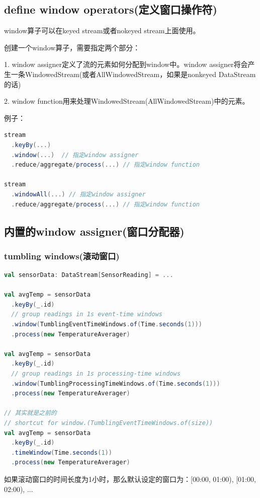 \documentclass[oneside]{ctexbook}
\begin{document}
\subsection{define window operators(定义窗口操作符)}

window算子可以在keyed stream或者nokeyed stream上面使用。

创建一个window算子，需要指定两个部分：

1. window assigner定义了流的元素如何分配到window中。window assigner将会产生一条WindowedStream(或者AllWindowedStream，如果是nonkeyed DataStream的话)

2. window function用来处理WindowedStream(AllWindowedStream)中的元素。

例子：

\begin{lstlisting}[language=scala]
stream
  .keyBy(...)
  .window(...)  // 指定window assigner
  .reduce/aggregate/process(...) // 指定window function

stream
  .windowAll(...) // 指定window assigner
  .reduce/aggregate/process(...) // 指定window function
\end{lstlisting}

\subsection{内置的window assigner(窗口分配器)}

\subsubsection{tumbling windows(滚动窗口)}

\begin{lstlisting}[language=scala]
val sensorData: DataStream[SensorReading] = ...

val avgTemp = sensorData
  .keyBy(_.id)
  // group readings in 1s event-time windows
  .window(TumblingEventTimeWindows.of(Time.seconds(1)))
  .process(new TemperatureAverager)

val avgTemp = sensorData
  .keyBy(_.id)
  // group readings in 1s processing-time windows
  .window(TumblingProcessingTimeWindows.of(Time.seconds(1)))
  .process(new TemperatureAverager)

// 其实就是之前的
// shortcut for window.(TumblingEventTimeWindows.of(size))
val avgTemp = sensorData
  .keyBy(_.id)
  .timeWindow(Time.seconds(1))
  .process(new TemperatureAverager)
\end{lstlisting}

如果滚动窗口的时间长度为1小时，那么默认设定的窗口为：[00:00, 01:00), [01:00, 02:00), ...
\end{document}
